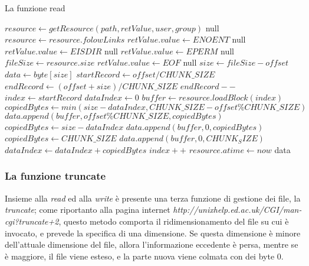 \begin{algorithm}
\begin{algorithmic}[5]
\caption{La funzione read}
	\State $resource \gets getResource(path, retValue, user, group)$
		\State \Return null
	\EndIf
		\State $resource \gets resource.folowLinks$
	\EndIf
		\State $retValue.value \gets ENOENT$
		\State \Return null
		\State $retValue.value \gets EISDIR$
		\State \Return null
	\EndIf
		\State $retValue.value \gets EPERM$ 
		\State \Return null
	\EndIf
	\State $fileSize \gets resource.size$
		\State $retValue.value \gets EOF$ 
		\State \Return null
	\EndIf
		\State $size \gets fileSize - offset$
	\EndIf
	\State $data \gets byte[size]$
	\State $startRecord \gets offset/CHUNK\_SIZE$
	\State $endRecord \gets (offset+size)/CHUNK\_SIZE$
		\State $endRecord--$
	\EndIf
	\State $index \gets startRecord$
	\State $dataIndex \gets 0$
		\State $buffer \gets resource.loadBlock(index)$
			\State $copiedBytes \gets min(size-dataIndex, CHUNK\_SIZE - offset\%CHUNK\_SIZE)$
			\State $data.append(buffer, offset\%CHUNK\_SIZE, copiedBytes)$
			\State $copiedBytes \gets size-dataIndex$		
			\State $data.append(buffer, 0, copiedBytes)$	
		\Else
			\State $copiedBytes \gets CHUNK\_SIZE$
			\State $data.append(buffer, 0, CHUNK_SIZE)$
		\EndIf
			\State $dataIndex \gets dataIndex+copiedBytes$
			\State $index++$
	\EndWhile
	\State $resource.atime \gets now$
	\State \Return data
\EndFunction
\end{algorithmic}
\end{algorithm}

\newpage

\subsubsection{La funzione truncate}
Insieme alla \emph{read} ed alla \emph{write} è presente una terza funzione di gestione dei file, la \emph{truncate}; come riportanto alla pagina internet \emph{http://unixhelp.ed.ac.uk/CGI/man-cgi?truncate+2}, questo metodo comporta il ridimensionamento del file su cui è invocato, e prevede la specifica di una dimensione. Se questa dimensione è minore dell'attuale dimensione del file, allora l'informazione eccedente è persa, mentre se è maggiore, il file viene esteso, e la parte nuova viene colmata con dei byte 0.

